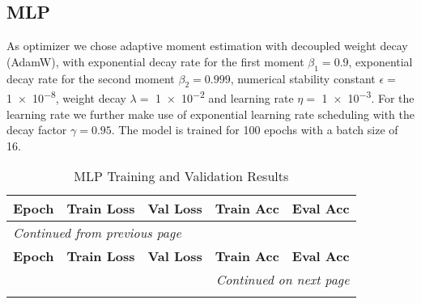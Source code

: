 \documentclass{article}
\begin{document}
\subsection{MLP}
As optimizer we chose adaptive moment estimation with decoupled weight decay (AdamW),
with exponential decay rate for the first moment $\beta_1=0.9$, exponential decay rate for the second moment $\beta_2= 0.999$,
numerical stability constant $\epsilon =$ \num{1e-8}, weight decay $\lambda=$ \num{1e-2} and learning rate $\eta=$ \num{1e-3}.
For the learning rate we further make use of exponential learning rate scheduling with the decay factor $\gamma=0.95$.
The model is trained for 100 epochs with a batch size of 16.
\begin{longtable}{c c c c c}
    \caption{MLP Training and Validation Results}\\
    \hline
    \textbf{Epoch} & \textbf{Train Loss} & \textbf{Val Loss} & \textbf{Train Acc} & \textbf{Eval Acc} \\
    \hline
    \endfirsthead
    
    \multicolumn{5}{l}{\small\itshape Continued from previous page}\\
    \hline
    \textbf{Epoch} & \textbf{Train Loss} & \textbf{Val Loss} & \textbf{Train Acc} & \textbf{Eval Acc} \\
    \hline
    \endhead
    
    \hline \multicolumn{5}{r}{\small\itshape Continued on next page}\\
    \endfoot
    

\end{longtable}
\end{document}
